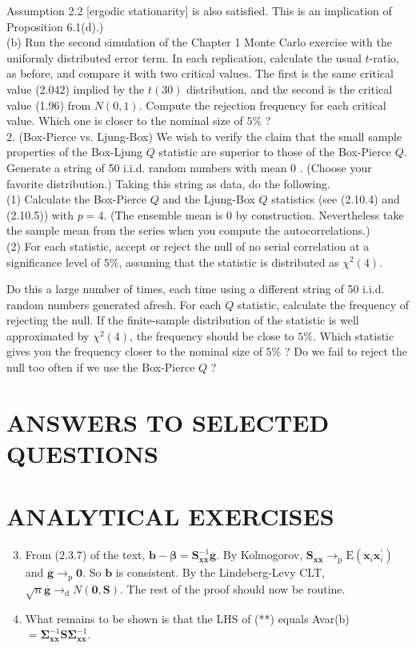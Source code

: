 \documentclass[10pt]{article}
\begin{document}
Assumption 2.2 [ergodic stationarity] is also satisfied. This is an implication of Proposition 6.1(d).)\\
(b) Run the second simulation of the Chapter 1 Monte Carlo exercise with the uniformly distributed error term. In each replication, calculate the usual $t$-ratio, as before, and compare it with two critical values. The first is the same critical value (2.042) implied by the $t(30)$ distribution, and the second is the critical value (1.96) from $N(0,1)$. Compute the rejection frequency for each critical value. Which one is closer to the nominal size of $5 \%$ ?\\
2. (Box-Pierce vs. Ljung-Box) We wish to verify the claim that the small sample properties of the Box-Ljung $Q$ statistic are superior to those of the Box-Pierce $Q$. Generate a string of 50 i.i.d. random numbers with mean 0 . (Choose your favorite distribution.) Taking this string as data, do the following.\\
(1) Calculate the Box-Pierce $Q$ and the Ljung-Box $Q$ statistics (see (2.10.4) and (2.10.5)) with $p=4$. (The ensemble mean is 0 by construction. Nevertheless take the sample mean from the series when you compute the autocorrelations.)\\
(2) For each statistic, accept or reject the null of no serial correlation at a significance level of $5 \%$, assuming that the statistic is distributed as $\chi^{2}(4)$.

Do this a large number of times, each time using a different string of 50 i.i.d. random numbers generated afresh. For each $Q$ statistic, calculate the frequency of rejecting the null. If the finite-sample distribution of the statistic is well approximated by $\chi^{2}(4)$, the frequency should be close to $5 \%$. Which statistic gives you the frequency closer to the nominal size of $5 \%$ ? Do we fail to reject the null too often if we use the Box-Pierce $Q$ ?

\section*{ANSWERS TO SELECTED QUESTIONS}
\section*{ANALYTICAL EXERCISES}
\begin{enumerate}
  \setcounter{enumi}{2}
  \item From (2.3.7) of the text, $\mathbf{b}-\boldsymbol{\beta}=\mathbf{S}_{\mathbf{x x}}^{-1} \overline{\mathbf{g}}$. By Kolmogorov, $\mathbf{S}_{\mathbf{x x}} \rightarrow_{\mathrm{p}} \mathrm{E}\left(\mathbf{x}_{i} \mathbf{x}_{i}^{\prime}\right)$ and $\overline{\mathbf{g}} \rightarrow_{\mathrm{p}} \mathbf{0}$. So $\mathbf{b}$ is consistent. By the Lindeberg-Levy CLT, $\sqrt{n} \overline{\mathbf{g}} \rightarrow_{\mathrm{d}} N(\mathbf{0}, \mathbf{S})$. The rest of the proof should now be routine.
  \item What remains to be shown is that the LHS of (**) equals Avar(b) $=\boldsymbol{\Sigma}_{\mathbf{x x}}^{-1} \mathbf{S} \boldsymbol{\Sigma}_{\mathbf{x x}}^{-1}$.
\end{enumerate}
\end{document}
